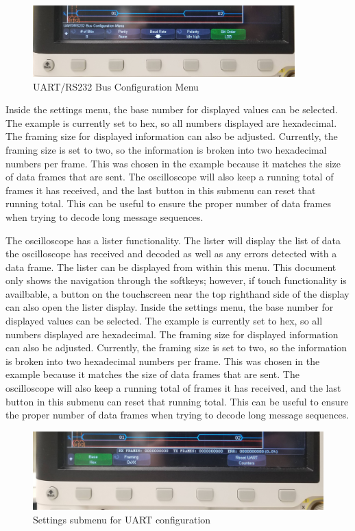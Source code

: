\documentclass{article}
\begin{document}
  \begin{figure}[h]
    \centering
    \includegraphics[width=0.9\textwidth]{images/uart/bus_config.jpg}
    \caption{UART/RS232 Bus Configuration Menu}
  \end{figure}

  Inside the settings menu, the base number for displayed values can be
  selected. The example is currently set to hex, so all numbers displayed are
  hexadecimal. The framing size for displayed information can also be adjusted.
  Currently, the framing size is set to two, so the information is broken into
  two hexadecimal numbers per frame. This was chosen in the example because it
  matches the size of data frames that are sent. The oscilloscope will also keep
  a running total of frames it has received, and the last button in this submenu
  can reset that running total. This can be useful to ensure the proper number
  of data frames when trying to decode long message sequences.

  The oscilloscope has a lister functionality. The lister will display the list
  of data the oscilloscope has received and decoded as well as any errors
  detected with a data frame. The lister can be displayed from within this menu.
  This document only shows the navigation through the softkeys; however, if
  touch functionality is availbable, a button on the touchscreen near the top
  righthand side of the display can also open the lister display.
  Inside the settings menu, the base number for displayed values can be
  selected. The example is currently set to hex, so all numbers displayed are
  hexadecimal. The framing size for displayed information can also be adjusted.
  Currently, the framing size is set to two, so the information is broken into
  two hexadecimal numbers per frame. This was chosen in the example because it
  matches the size of data frames that are sent. The oscilloscope will also keep
  a running total of frames it has received, and the last button in this submenu
  can reset that running total. This can be useful to ensure the proper number
  of data frames when trying to decode long message sequences.

  \begin{figure}[ht]
    \includegraphics[width=\textwidth]{images/uart/uart_settings.jpg}
    \caption{Settings submenu for UART configuration}
  \end{figure}
\end{document}
